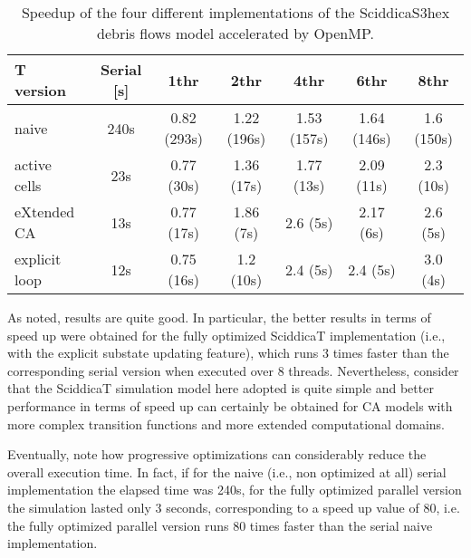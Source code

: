 \begin{table}
  \centering
  \footnotesize
  \begin{tabular}{l|c|c|c|c|c|c}
    \hline
    T version & Serial [s] & 1thr & 2thr & 4thr & 6thr & 8thr\\
    \hline
    \hline
    naive         & 240s & 0.82 (293s) & 1.22 (196s) & 1.53 (157s) & 1.64 (146s) & 1.6 (150s)\\
    active cells  & 23s  & 0.77 (30s)  & 1.36 (17s)  & 1.77 (13s)  & 2.09 (11s)  & 2.3 (10s)\\
    eXtended CA   & 13s  & 0.77 (17s)  & 1.86 (7s)   & 2.6  (5s)   & 2.17  (6s)  & 2.6 (5s)\\
    explicit loop & 12s  & 0.75 (16s)  & 1.2  (10s)  & 2.4  (5s)   & 2.4  (5s)   & 3.0 (4s)\\
    \hline
  \end{tabular}
  \caption{Speedup of the four different
    implementations of the SciddicaS3hex debris flows model accelerated by OpenMP.}
  \label{tab:speedup}
\end{table}

As noted, results are quite good. In particular, the better
results in terms of speed up were obtained for the fully optimized
SciddicaT implementation (i.e., with the explicit substate updating
feature), which runs 3 times faster than the corresponding serial
version when executed over 8 threads. Nevertheless, consider that the
SciddicaT simulation model here adopted is quite simple and better
performance in terms of speed up can certainly be obtained for CA
models with more complex transition functions and more extended
computational domains.

Eventually, note how progressive optimizations can considerably
reduce the overall execution time. In fact, if for the naive (i.e., non
optimized at all) serial implementation the elapsed time was 240s, for
the fully optimized parallel version the simulation lasted only 3
seconds, corresponding to a speed up value of 80, i.e. the fully
optimized parallel version runs 80 times faster than the serial naive
implementation.


